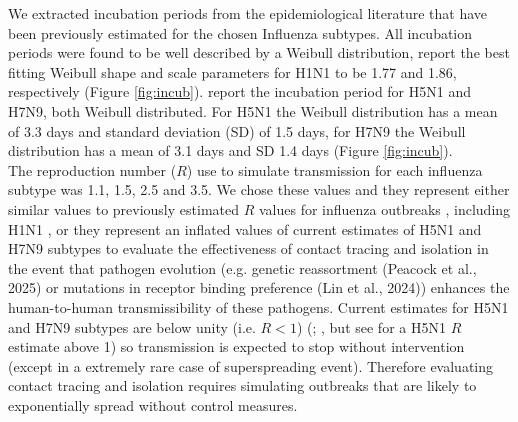 \documentclass{article}
\begin{document}
We extracted incubation periods from the epidemiological literature that have been previously estimated for the chosen Influenza subtypes. All incubation periods were found to be well described by a Weibull distribution, \cite{nishiuraEstimationIncubationPeriod2011} report the best fitting Weibull shape and scale parameters for H1N1 to be 1.77 and 1.86, respectively (Figure \ref{fig:incub}). \cite{cowlingComparativeEpidemiologyHuman2013} report the incubation period for H5N1 and H7N9, both Weibull distributed. For H5N1 the Weibull distribution has a mean of 3.3 days and standard deviation (SD) of 1.5 days, for H7N9 the Weibull distribution has a mean of 3.1 days and SD 1.4 days \citep{cowlingComparativeEpidemiologyHuman2013} (Figure \ref{fig:incub}). \\

The reproduction number ($R$) use to simulate transmission for each influenza subtype was 1.1, 1.5, 2.5 and 3.5. We chose these values and they represent either similar values to previously estimated $R$ values for influenza outbreaks \citep{fergusonStrategiesMitigatingInfluenza2006}, including H1N1 \citep{fraserPandemicPotentialStrain2009, lesslerOutbreak2009Pandemic2009}, or they represent an inflated values of current estimates of H5N1 and H7N9 subtypes to evaluate the effectiveness of contact tracing and isolation in the event that pathogen evolution (e.g. genetic reassortment (Peacock et al., 2025) or mutations in receptor binding preference (Lin et al., 2024)) enhances the human-to-human transmissibility of these pathogens. Current estimates for H5N1 and H7N9 subtypes are below unity (i.e. $R < 1$) (\citealt{tannerPandemicPotentialAvian2015}; \citealt{Ward2024.12.11.24318702}, but see \citealt{yangDetectingHumanhumanTransmission2007a} for a H5N1 $R$ estimate above 1) so transmission is expected to stop without intervention (except in a extremely rare case of superspreading event). Therefore evaluating contact tracing and isolation requires simulating outbreaks that are likely to exponentially spread without control measures.
\end{document}

